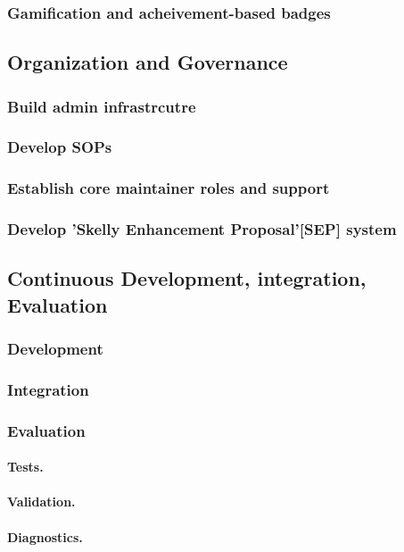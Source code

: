 \documentclass[11pt]{article}
\begin{document}
\subsubsection{Gamification and acheivement-based badges}

\subsection{Organization and Governance}
\subsubsection{Build admin infrastrcutre}
\subsubsection{Develop SOPs}
\subsubsection{Establish core maintainer roles and support}
\subsubsection{Develop 'Skelly Enhancement Proposal'[SEP] system}

\subsection{Continuous Development, integration, Evaluation}
\subsubsection{Development}
\subsubsection{Integration}
\subsubsection{Evaluation}
\paragraph{Tests.}
\paragraph{Validation.}
\paragraph{Diagnostics.}
\end{document}
